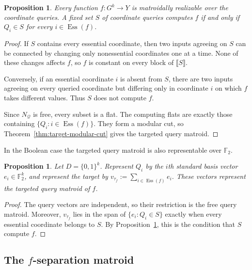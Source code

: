 \documentclass[11pt]{article}
\numberwithin{equation}{section}
\newtheorem{proposition}[definition]{Proposition}
\theoremstyle{remark}
\begin{document}
\begin{proposition}
\label{prop:coordinate-target-matroid}
Every function $f:G^k\to Y$ is matroidally realizable over the coordinate
queries. A fixed set $S$ of coordinate queries computes $f$ if and only if
$Q_i\in S$ for every $i\in\operatorname{Ess}(f)$.
\end{proposition}

\begin{proof}
If $S$ contains every essential coordinate, then two inputs agreeing on $S$
can be connected by changing only nonessential coordinates one at a time.
None of these changes affects $f$, so $f$ is constant on every block of
$\llbracket S\rrbracket$.

Conversely, if an essential coordinate $i$ is absent from $S$, there are two
inputs agreeing on every queried coordinate but differing only in coordinate
$i$ on which $f$ takes different values. Thus $S$ does not compute $f$.

Since $N_{\mathcal Q}$ is free, every subset is a flat. The computing flats
are exactly those containing
$\{Q_i:i\in\operatorname{Ess}(f)\}$. They form a modular cut, so
Theorem~\ref{thm:target-modular-cut} gives the targeted query matroid.
\end{proof}

In the Boolean case the targeted query matroid is also representable over $\mathbb F_2$.

\begin{proposition}
\label{prop:boolean-coordinate-representation}
Let $D=\{0,1\}^k$. Represent $Q_i$ by the $i$th standard basis vector
$e_i\in\mathbb F_2^k$, and represent the target by $v_{\tau_f}:=\sum_{i\in\operatorname{Ess}(f)}e_i$. These vectors represent the targeted query matroid of $f$.
\end{proposition}

\begin{proof}
The query vectors are independent, so their restriction is the free query
matroid. Moreover, $v_{\tau_f}$ lies in the span of
$\{e_i:Q_i\in S\}$ exactly when every essential coordinate belongs to $S$.
By Proposition~\ref{prop:coordinate-target-matroid}, this is the condition
that $S$ compute $f$.
\end{proof}

\subsection{The \texorpdfstring{$f$}{f}-separation matroid}
\label{subsec:f-separation-matroid}
\end{document}
